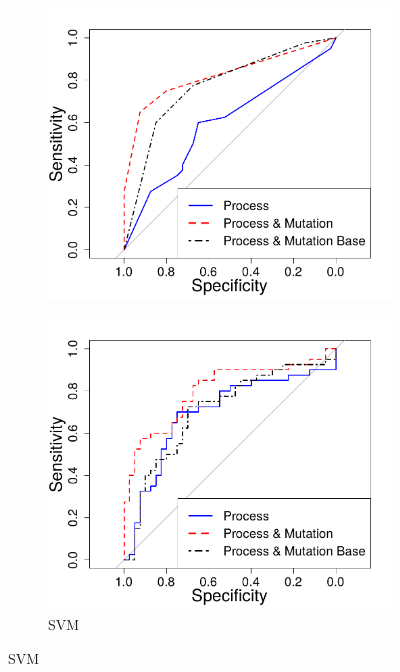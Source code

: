 \begin{figure}[H]
	\begin{subfigure}{.5\textwidth}
		\centering
		\includegraphics[width=\linewidth]{img/evaluation/phase2-part1-roc-dt.pdf}
		\caption{}
	\end{subfigure}
	\begin{subfigure}{.5\textwidth}
		\centering
		\includegraphics[width=\linewidth]{img/evaluation/phase2-part1-roc-svm.pdf}
		\caption{SVM}
	\end{subfigure}

\end{figure}
